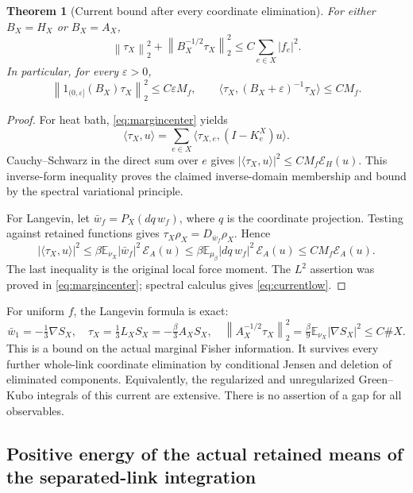 \documentclass[11pt,letterpaper]{article}
\newtheorem{theorem}{Theorem}[section]
\theoremstyle{remark}\newtheorem{remark}[theorem]{Remark}
\newcommand{\E}{\mathbb E}
\newcommand{\norm}[1]{\left\lVert#1\right\rVert}
\newcommand{\cE}{\mathcal E}
\begin{document}
\begin{theorem}[Current bound after every coordinate elimination]\label{thm:current}
For either $B_X=H_X$ or $B_X=A_X$,
\begin{equation}\label{eq:currentneg}
 \boxed{\quad
 \norm{\tau_X}_2^2+\norm{B_X^{-1/2}\tau_X}_2^2
 \le C\sum_{e\in X}|f_e|^2.
 \quad}
\end{equation}
In particular, for every $\varepsilon>0$,
\begin{equation}\label{eq:currentlow}
 \norm{1_{(0,\varepsilon]}(B_X)\tau_X}_2^2\le C\varepsilon M_f,\qquad
 \langle\tau_X,(B_X+\varepsilon)^{-1}\tau_X\rangle\le CM_f.
\end{equation}
\end{theorem}
\begin{proof}
For heat bath, \eqref{eq:margincenter} yields
\[
 \langle\tau_X,u\rangle
 =\sum_{e\in X}\langle\tau_{X,e},(I-K_e^X)u\rangle.
\]
Cauchy--Schwarz in the direct sum over $e$ gives
$|\langle\tau_X,u\rangle|^2\le CM_f\cE_H(u)$.
This inverse-form inequality proves the claimed inverse-domain membership and bound by the spectral variational principle.

For Langevin, let $\bar w_f=P_X(dq\,w_f)$, where $q$ is the coordinate projection. Testing against retained functions gives
$\tau_X\rho_X=D_{\bar w_f}\rho_X$. Hence
\[
 |\langle\tau_X,u\rangle|^2
 \le \beta\E_{\nu_X}|\bar w_f|^2\,\cE_A(u)
 \le \beta\E_{\mu_\beta}|dq\,w_f|^2\,\cE_A(u)
 \le CM_f\cE_A(u).
\]
The last inequality is the original local force moment. The $L^2$ assertion was proved in \eqref{eq:margincenter}; spectral calculus gives \eqref{eq:currentlow}.
\end{proof}

For uniform $f$, the Langevin formula is exact:
\begin{equation}\label{eq:fisher}
 \bar w_1=-\tfrac13\nabla S_X,\quad
 \tau_X=\tfrac13L_XS_X=-\tfrac{\beta}{3}A_XS_X,\quad
 \norm{A_X^{-1/2}\tau_X}_2^2
 =\tfrac{\beta}{9}\E_{\nu_X}|\nabla S_X|^2
 \le C\#X.
\end{equation}
This is a bound on the actual marginal Fisher information. It survives every further whole-link coordinate elimination by conditional Jensen and deletion of eliminated components. Equivalently, the regularized and unregularized Green--Kubo integrals of this current are extensive. There is no assertion of a gap for all observables.

\subsection{Positive energy of the actual retained means of the separated-link integration}
\end{document}
